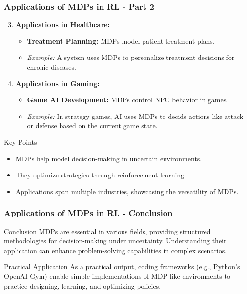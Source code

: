 \documentclass{beamer}
\begin{document}
\begin{frame}[fragile]
    \frametitle{Applications of MDPs in RL - Part 2}
    \begin{enumerate}
        \setcounter{enumi}{2}
        \item \textbf{Applications in Healthcare:}
            \begin{itemize}
                \item \textbf{Treatment Planning:} MDPs model patient treatment plans.
                \item \textit{Example:} A system uses MDPs to personalize treatment decisions for chronic diseases.
            \end{itemize}
        
        \item \textbf{Applications in Gaming:}
            \begin{itemize}
                \item \textbf{Game AI Development:} MDPs control NPC behavior in games.
                \item \textit{Example:} In strategy games, AI uses MDPs to decide actions like attack or defense based on the current game state.
            \end{itemize}
    \end{enumerate}

    \begin{block}{Key Points}
        \begin{itemize}
            \item MDPs help model decision-making in uncertain environments.
            \item They optimize strategies through reinforcement learning.
            \item Applications span multiple industries, showcasing the versatility of MDPs.
        \end{itemize}
    \end{block}
\end{frame}

\begin{frame}[fragile]
    \frametitle{Applications of MDPs in RL - Conclusion}
    \begin{block}{Conclusion}
        MDPs are essential in various fields, providing structured methodologies for decision-making under uncertainty. Understanding their application can enhance problem-solving capabilities in complex scenarios.
    \end{block}

    \begin{block}{Practical Application}
        As a practical output, coding frameworks (e.g., Python's OpenAI Gym) enable simple implementations of MDP-like environments to practice designing, learning, and optimizing policies.
    \end{block}
\end{frame}
\end{document}
